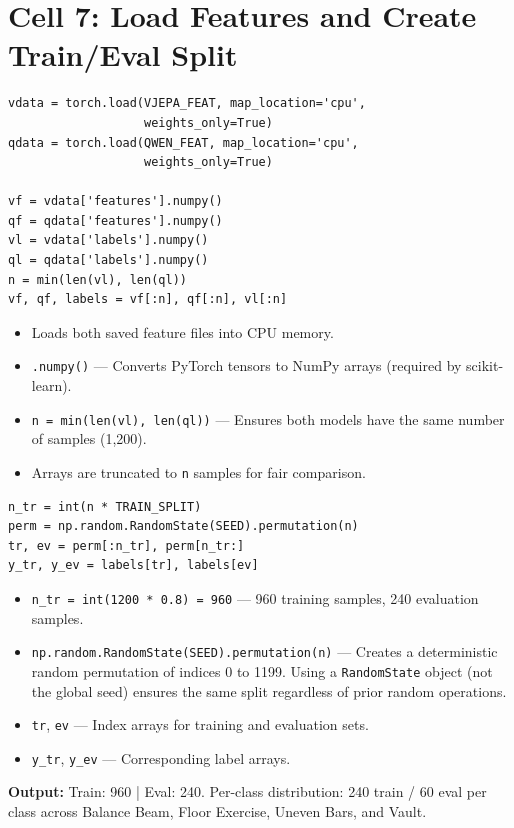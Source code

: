 \newpage
\section{Cell 7: Load Features and Create Train/Eval Split}

\begin{lstlisting}
vdata = torch.load(VJEPA_FEAT, map_location='cpu',
                   weights_only=True)
qdata = torch.load(QWEN_FEAT, map_location='cpu',
                   weights_only=True)

vf = vdata['features'].numpy()
qf = qdata['features'].numpy()
vl = vdata['labels'].numpy()
ql = qdata['labels'].numpy()
n = min(len(vl), len(ql))
vf, qf, labels = vf[:n], qf[:n], vl[:n]
\end{lstlisting}

\begin{explanation}
\begin{itemize}[nosep]
  \item Loads both saved feature files into CPU memory.
  \item \texttt{.numpy()} --- Converts PyTorch tensors to NumPy arrays (required by scikit-learn).
  \item \texttt{n = min(len(vl), len(ql))} --- Ensures both models have the same number of samples (1,200).
  \item Arrays are truncated to \texttt{n} samples for fair comparison.
\end{itemize}
\end{explanation}

\begin{lstlisting}
n_tr = int(n * TRAIN_SPLIT)
perm = np.random.RandomState(SEED).permutation(n)
tr, ev = perm[:n_tr], perm[n_tr:]
y_tr, y_ev = labels[tr], labels[ev]
\end{lstlisting}

\begin{explanation}
\begin{itemize}[nosep]
  \item \texttt{n\_tr = int(1200 * 0.8) = 960} --- 960 training samples, 240 evaluation samples.
  \item \texttt{np.random.RandomState(SEED).permutation(n)} --- Creates a deterministic random permutation of indices 0 to 1199. Using a \texttt{RandomState} object (not the global seed) ensures the same split regardless of prior random operations.
  \item \texttt{tr}, \texttt{ev} --- Index arrays for training and evaluation sets.
  \item \texttt{y\_tr}, \texttt{y\_ev} --- Corresponding label arrays.
\end{itemize}
\textbf{Output:} Train: 960 | Eval: 240. Per-class distribution: 240 train / 60 eval per class across Balance Beam, Floor Exercise, Uneven Bars, and Vault.
\end{explanation}

